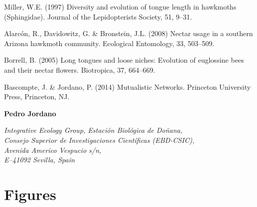 \documentclass[a4paper,12pt]{article}
\begin{document}
\begin{thebibliography}{10}
Miller, W.E. (1997) Diversity and evolution of tongue length in hawkmoths (Sphingidae). Journal of the Lepidopterists Society, 51, 9–31.

Alarcón, R., Davidowitz, G. \& Bronstein, J.L. (2008) Nectar usage in a southern Arizona hawkmoth community. Ecological Entomology, 33, 503–509.

Borrell, B. (2005) Long tongues and loose niches: Evolution of euglossine bees and their nectar flowers. Biotropica, 37, 664–669.

Bascompte, J. \& Jordano, P. (2014) Mutualistic Networks. Princeton University Press, Princeton, NJ.

\end{thebibliography}


\begin{flushright}
  \noindent 
  		\textbf{Pedro Jordano }\\
  		\begin{spacing}{1.0}
		\textit{Integrative Ecology Group, Estaci\'on Biol\'ogica de Do\~nana, \\ Consejo Superior de Investigaciones Cient\'ificas (EBD-CSIC), \\ Avenida Americo Vespucio s\slash n, \\ E--41092 Sevilla, Spain}
		\end{spacing}
\end{flushright}
\newpage

\pagestyle{empty}
\section*{Figures}
\end{document}
